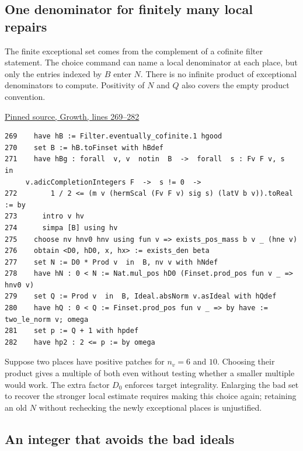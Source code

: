 \documentclass[12pt,letterpaper]{article}
\begin{document}
\clearpage\subsection*{One denominator for finitely many local repairs}

The finite exceptional set comes from the complement of a cofinite filter statement. The choice command can name a local denominator at each place, but only the entries indexed by \(B\) enter \(N\). There is no infinite product of exceptional denominators to compute. Positivity of \(N\) and \(Q\) also covers the empty product convention.

\par\smallskip\href{https://github.com/nousentllc/riemann-hypothesis/blob/40e56bab026552e089d7afcfeff08d2defb9c005/src/CompanionTheory/SpectralGeometry/LocalGlobalProofs/AdelicAnalysis/RankOneLocalDensitiesProductConverges.lean#L269-L282}{\sffamily\small Pinned source, Growth, lines 269--282}\par

{\footnotesize\begin{verbatim}
269    have hB := Filter.eventually_cofinite.1 hgood
270    set B := hB.toFinset with hBdef
271    have hBg : forall  v, v  notin  B  ->  forall  s : Fv F v, s  in
     v.adicCompletionIntegers F  ->  s != 0  ->
272        1 / 2 <= (m v (hermScal (Fv F v) sig s) (latV b v)).toReal := by
273      intro v hv
274      simpa [B] using hv
275    choose nv hnv0 hnv using fun v => exists_pos_mass b v _ (hne v)
276    obtain <D0, hD0, x, hx> := exists_den beta
277    set N := D0 * Prod v  in  B, nv v with hNdef
278    have hN : 0 < N := Nat.mul_pos hD0 (Finset.prod_pos fun v _ => hnv0 v)
279    set Q := Prod v  in  B, Ideal.absNorm v.asIdeal with hQdef
280    have hQ : 0 < Q := Finset.prod_pos fun v _ => by have := two_le_norm v; omega
281    set p := Q + 1 with hpdef
282    have hp2 : 2 <= p := by omega
\end{verbatim}
}

Suppose two places have positive patches for \(n_v=6\) and \(10\). Choosing their product gives a multiple of both even without testing whether a smaller multiple would work. The extra factor \(D_0\) enforces target integrality. Enlarging the bad set to recover the stronger local estimate requires making this choice again; retaining an old \(N\) without rechecking the newly exceptional places is unjustified.

\clearpage\subsection*{An integer that avoids the bad ideals}
\end{document}
